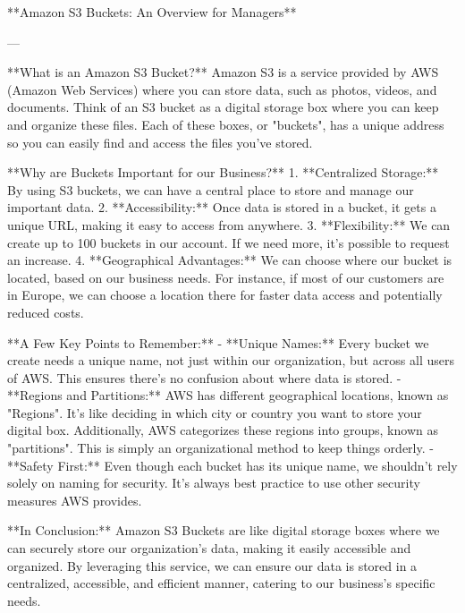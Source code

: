 **Amazon S3 Buckets: An Overview for Managers**

---

**What is an Amazon S3 Bucket?**
Amazon S3 is a service provided by AWS (Amazon Web Services) where you can store data, such as photos, videos, and documents. Think of an S3 bucket as a digital storage box where you can keep and organize these files. Each of these boxes, or "buckets", has a unique address so you can easily find and access the files you've stored.

**Why are Buckets Important for our Business?**
1. **Centralized Storage:** By using S3 buckets, we can have a central place to store and manage our important data.
2. **Accessibility:** Once data is stored in a bucket, it gets a unique URL, making it easy to access from anywhere.
3. **Flexibility:** We can create up to 100 buckets in our account. If we need more, it's possible to request an increase.
4. **Geographical Advantages:** We can choose where our bucket is located, based on our business needs. For instance, if most of our customers are in Europe, we can choose a location there for faster data access and potentially reduced costs.

**A Few Key Points to Remember:**
- **Unique Names:** Every bucket we create needs a unique name, not just within our organization, but across all users of AWS. This ensures there's no confusion about where data is stored.
- **Regions and Partitions:** AWS has different geographical locations, known as "Regions". It's like deciding in which city or country you want to store your digital box. Additionally, AWS categorizes these regions into groups, known as "partitions". This is simply an organizational method to keep things orderly.
- **Safety First:** Even though each bucket has its unique name, we shouldn't rely solely on naming for security. It's always best practice to use other security measures AWS provides.

**In Conclusion:** 
Amazon S3 Buckets are like digital storage boxes where we can securely store our organization's data, making it easily accessible and organized. By leveraging this service, we can ensure our data is stored in a centralized, accessible, and efficient manner, catering to our business's specific needs.